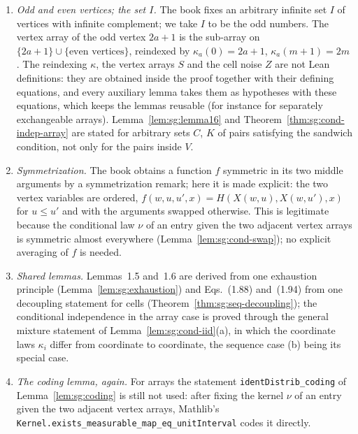 \begin{remark}
\begin{enumerate}
\item \emph{Odd and even vertices; the set $I$.} The book fixes an arbitrary infinite set $I$ of vertices with infinite complement; we take $I$ to be the odd numbers. The vertex array of the odd vertex $2a+1$ is the sub-array on $\{2a+1\}\cup\{\text{even vertices}\}$, reindexed by $\kappa_a(0)=2a+1$, $\kappa_a(m+1)=2m$. The reindexing $\kappa$, the vertex arrays $S$ and the cell noise $Z$ are not Lean definitions: they are obtained inside the proof together with their defining equations, and every auxiliary lemma takes them as hypotheses with these equations, which keeps the lemmas reusable (for instance for separately exchangeable arrays). Lemma~\ref{lem:sg:lemma16} and Theorem~\ref{thm:sg:cond-indep-array} are stated for arbitrary sets $C$, $K$ of pairs satisfying the sandwich condition, not only for the pairs inside $V$.
\item \emph{Symmetrization.} The book obtains a function $f$ symmetric in its two middle arguments by a symmetrization remark; here it is made explicit: the two vertex variables are ordered, $f(w,u,u',x)=H(X(w,u),X(w,u'),x)$ for $u\le u'$ and with the arguments swapped otherwise. This is legitimate because the conditional law $\nu$ of an entry given the two adjacent vertex arrays is symmetric almost everywhere (Lemma~\ref{lem:sg:cond-swap}); no explicit averaging of $f$ is needed.
\item \emph{Shared lemmas.} Lemmas~1.5 and~1.6 are derived from one exhaustion principle (Lemma~\ref{lem:sg:exhaustion}) and Eqs.~(1.88) and~(1.94) from one decoupling statement for cells (Theorem~\ref{thm:sg:seq-decoupling}); the conditional independence in the array case is proved through the general mixture statement of Lemma~\ref{lem:sg:cond-iid}(a), in which the coordinate laws $\kappa_i$ differ from coordinate to coordinate, the sequence case (b) being its special case.
\item \emph{The coding lemma, again.} For arrays the statement \texttt{identDistrib\_coding} of Lemma~\ref{lem:sg:coding} is still not used: after fixing the kernel $\nu$ of an entry given the two adjacent vertex arrays, Mathlib's \texttt{Kernel.exists\_measurable\_map\_eq\_unitInterval} codes it directly.

\end{enumerate}
\end{remark}
